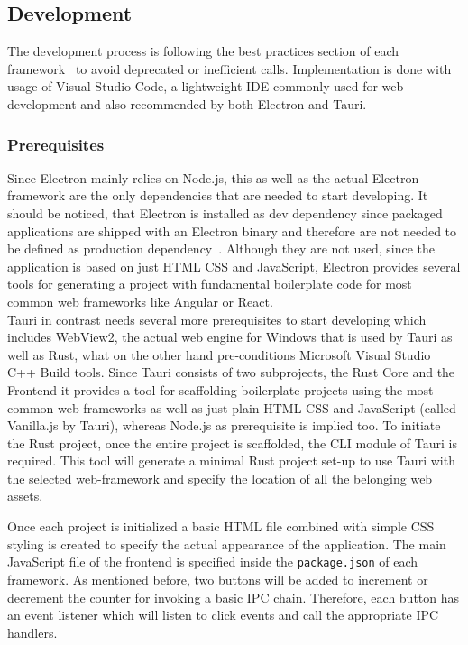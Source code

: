 
\subsection{Development}
\label{subsec:impl:dev}
The development process is following the best practices section of each framework~\cite{ElectronDoc,tauri} to avoid deprecated or inefficient calls.
Implementation is done with usage of Visual Studio Code, a lightweight \ac{IDE} commonly used for web development and also recommended by both Electron and Tauri.

\subsubsection{Prerequisites}

Since Electron mainly relies on Node.js, this as well as the actual Electron framework are the only dependencies that are needed to start developing.
It should be noticed, that Electron is installed as dev dependency since packaged applications are shipped with an Electron binary and therefore are not needed to be defined as production dependency~\cite{electron-in-action}.
Although they are not used, since the application is based on just \ac{HTML} \ac{CSS} and JavaScript, Electron provides several tools for generating a project with fundamental boilerplate code for most common web frameworks like Angular or React.\\
Tauri in contrast needs several more prerequisites to start developing which includes WebView2, the actual web engine for Windows that is used by Tauri as well as Rust, what on the other hand pre-conditions Microsoft Visual Studio C++ Build tools.
Since Tauri consists of two subprojects, the Rust Core and the Frontend it provides a tool for scaffolding boilerplate projects using the most common web-frameworks as well as just plain \ac{HTML} \ac{CSS} and JavaScript (called Vanilla.js by Tauri),
whereas Node.js as prerequisite is implied too.
To initiate the Rust project, once the entire project is scaffolded, the CLI module of Tauri is required.
This tool will generate a minimal Rust project set-up to use Tauri with the selected web-framework and specify the location of all the belonging web assets.

Once each project is initialized a basic \ac{HTML} file combined with simple \ac{CSS} styling is created to specify the actual appearance of the application.
The main JavaScript file of the frontend is specified inside the \texttt{package.json} of each framework.
As mentioned before, two buttons will be added to increment or decrement the counter for invoking a basic \ac{IPC} chain.
Therefore, each button has an event listener which will listen to click events and call the appropriate \ac{IPC} handlers.

